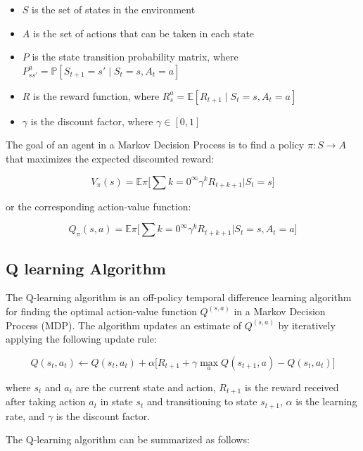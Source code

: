 \documentclass[12pt,oneside]{article}
\begin{document}
\begin{itemize}
\item $S$ is the set of states in the environment
\item $A$ is the set of actions that can be taken in each state
\item $P$ is the state transition probability matrix, where $P_{ss'}^a = \mathbb{P}[S_{t+1} = s' \mid S_t = s, A_t = a]$
\item $R$ is the reward function, where $R_s^a = \mathbb{E}[R_{t+1} \mid S_t = s, A_t = a]$
\item $\gamma$ is the discount factor, where $\gamma \in [0, 1]$
\end{itemize}

The goal of an agent in a Markov Decision Process is to find a policy $\pi: S \rightarrow A$ that maximizes the expected discounted reward:

\begin{equation*}
V_\pi(s) = \mathbb{E}\pi\Bigg[\sum{k=0}^\infty \gamma^k R_{t+k+1} \Bigg| S_t = s\Bigg]
\end{equation*}

or the corresponding action-value function:

\begin{equation*}
Q_\pi(s, a) = \mathbb{E}\pi\Bigg[\sum{k=0}^\infty \gamma^k R_{t+k+1} \Bigg| S_t = s, A_t = a\Bigg]
\end{equation*}

\subsection{Q learning Algorithm}
The Q-learning algorithm is an off-policy temporal difference learning algorithm for finding the optimal action-value function $Q^(s, a)$ in a Markov Decision Process (MDP). The algorithm updates an estimate of $Q^(s, a)$ by iteratively applying the following update rule:

\begin{equation*}
Q(s_t, a_t) \leftarrow Q(s_t, a_t) + \alpha\Big[ R_{t+1} + \gamma\max_{a} Q(s_{t+1}, a) - Q(s_t, a_t) \Big]
\end{equation*}

where $s_t$ and $a_t$ are the current state and action, $R_{t+1}$ is the reward received after taking action $a_t$ in state $s_t$ and transitioning to state $s_{t+1}$, $\alpha$ is the learning rate, and $\gamma$ is the discount factor.

The Q-learning algorithm can be summarized as follows:
\end{document}
